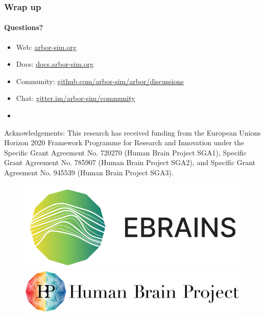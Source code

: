 \documentclass[t]{beamer}
\begin{document}
\begin{frame}
    \frametitle{Wrap up}
    \framesubtitle{Questions?}
    \begin{itemize}
        \item Web: \url{arbor-sim.org}
        \item Docs: \url{docs.arbor-sim.org}
        \item Community: \url{github.com/arbor-sim/arbor/discussions}
        \item Chat: \url{gitter.im/arbor-sim/community}
        \item[]
    \end{itemize}

    { \scriptsize Acknowledgements: This research has received funding from the European Unions
    Horizon 2020 Framework Programme for Research and
    Innovation under the Specific Grant Agreement No. 720270
    (Human Brain Project SGA1), Specific Grant Agreement No.
    785907 (Human Brain Project SGA2), and Specific Grant
    Agreement No. 945539 (Human Brain Project SGA3). }
    \newline
    \begin{figure}[h]
        \begin{center}
            \includegraphics[width=0.2\linewidth]{ebrains_logo.png}
            \hspace{2em}
            \includegraphics[width=0.4\linewidth]{HBP_logo.jpg}
        \end{center}
    \end{figure}
\end{frame}
\end{document}
